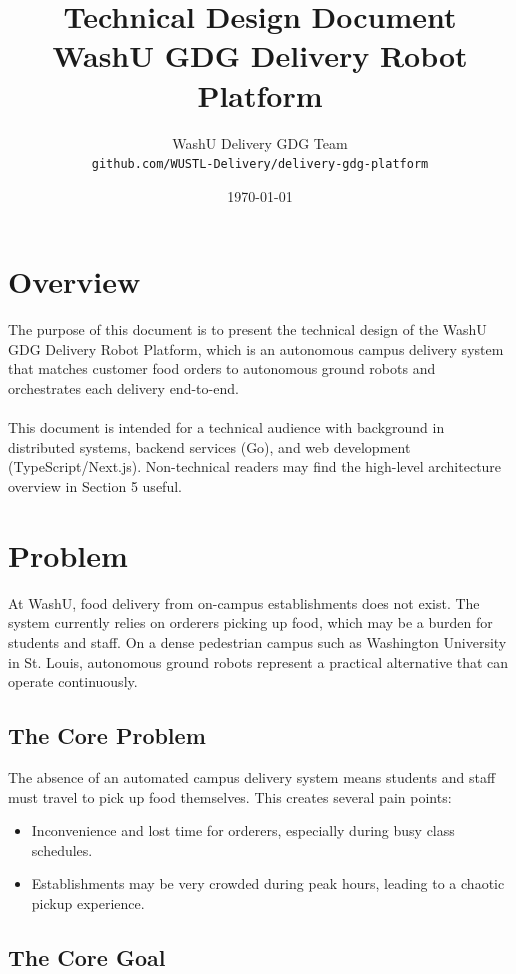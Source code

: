 \documentclass[12pt,a4paper]{article}
\title{\textbf{Technical Design Document}\\[0.5em]\large WashU GDG Delivery Robot Platform}
\author{
    WashU Delivery GDG Team \\
    \texttt{github.com/WUSTL-Delivery/delivery-gdg-platform}
}
\date{\today}
\begin{document}
\maketitle
\newpage
\tableofcontents
\newpage

\section{Overview}
The purpose of this document is to present the technical design of the WashU GDG Delivery Robot Platform, which is an autonomous campus delivery system that matches customer food orders to autonomous ground robots and orchestrates each delivery end-to-end. \\\\
This document is intended for a technical audience with background in distributed systems, backend services (Go), and web development (TypeScript/Next.js). Non-technical readers may find the high-level architecture overview in Section 5 useful.
\newpage
\section{Problem}

At WashU, food delivery from on-campus establishments does not exist. The system currently relies on orderers picking up food, which may be a burden for students and staff. On a dense pedestrian campus such as Washington University in St. Louis, autonomous ground robots represent a practical alternative that can operate continuously.

\subsection{The Core Problem}

The absence of an automated campus delivery system means students and staff must travel to pick up food themselves. This creates several pain points:
\begin{itemize}
  \item Inconvenience and lost time for orderers, especially during busy class schedules.
  \item Establishments may be very crowded during peak hours, leading to a chaotic pickup experience.
\end{itemize}

\subsection{The Core Goal}
\end{document}
